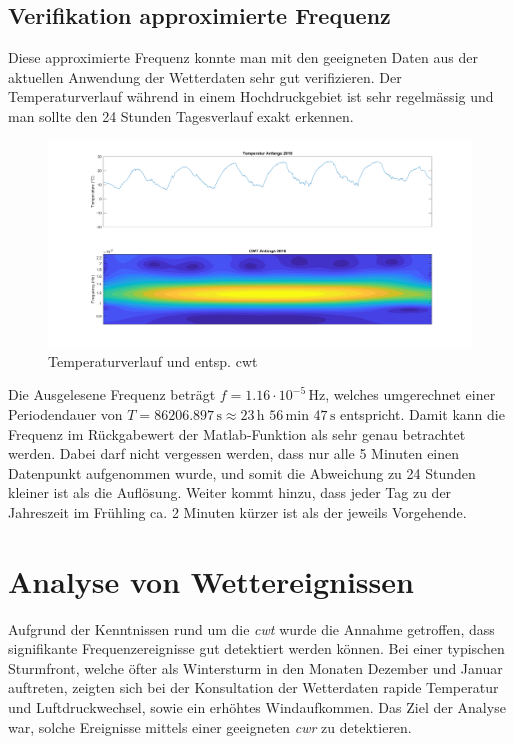 \begin{refsection}
\newpage
\subsection{Verifikation approximierte Frequenz}
Diese approximierte Frequenz konnte man mit den geeigneten Daten aus der aktuellen Anwendung der Wetterdaten sehr gut verifizieren.
Der Temperaturverlauf während in einem Hochdruckgebiet ist sehr regelmässig und man sollte den 24 Stunden Tagesverlauf exakt erkennen.

\begin{figure}[h]
	\centering
	\includegraphics[width=1\textwidth]{papers/wwt/images/zoom.png}
	\caption{Temperaturverlauf und entsp. cwt}
	\label{fig:cwt_zoom}
\end{figure}

Die Ausgelesene Frequenz beträgt $f = 1.16\cdot10^{-5} \,\text{Hz}$, welches umgerechnet einer Periodendauer von $T = 86206.897\,\text{s}\approx 23\,\text{h }56\,\text{min } 47\,\text{s}$ entspricht.
Damit kann die Frequenz im Rückgabewert der Matlab-Funktion als sehr genau betrachtet werden. Dabei darf nicht vergessen werden, dass nur alle 5 Minuten einen Datenpunkt aufgenommen wurde, und somit die Abweichung zu 24 Stunden kleiner ist als die Auflösung.
Weiter kommt hinzu, dass jeder Tag zu der Jahreszeit im Frühling ca. 2 Minuten kürzer ist als der jeweils Vorgehende.




\section{Analyse von Wettereignissen}
Aufgrund der Kenntnissen rund um die \textit{cwt} wurde die Annahme getroffen, dass signifikante Frequenzereignisse gut detektiert werden können. Bei einer typischen Sturmfront, welche öfter als Wintersturm in den Monaten Dezember und Januar auftreten, zeigten sich bei der Konsultation der Wetterdaten rapide Temperatur und Luftdruckwechsel, sowie ein erhöhtes Windaufkommen.
Das Ziel der Analyse war, solche Ereignisse mittels einer geeigneten \textit{cwr} zu detektieren.

\end{refsection}
